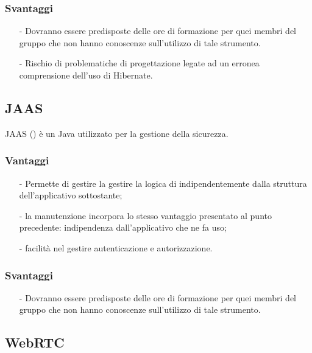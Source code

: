 \subsubsection*{Svantaggi}
\begin{itemize}[noitemsep,nolistsep]
  \item[-] Dovranno essere predisposte delle ore di formazione per quei membri del gruppo che non hanno conoscenze sull'utilizzo di tale strumento.
  \item[-] Rischio di problematiche di progettazione legate ad un erronea comprensione dell'uso di Hibernate.
\end{itemize}

\subsection{JAAS}\label{sec:hibernate}

JAAS () è un  Java utilizzato per la gestione della sicurezza.

\subsubsection*{Vantaggi}
\begin{itemize}[noitemsep,nolistsep]
	\item[-] Permette di gestire la gestire la logica di  indipendentemente dalla struttura dell'applicativo sottostante;
	\item[-] la manutenzione incorpora lo stesso vantaggio presentato al punto precedente: indipendenza dall'applicativo che ne fa uso;
	\item[-] facilità nel gestire autenticazione e autorizzazione.
\end{itemize}

\subsubsection*{Svantaggi}
\begin{itemize}[noitemsep,nolistsep]
  \item[-] Dovranno essere predisposte delle ore di formazione per quei membri del gruppo che non hanno conoscenze sull'utilizzo di tale strumento.
\end{itemize}

\subsection{WebRTC}\label{sec:hibernate}

